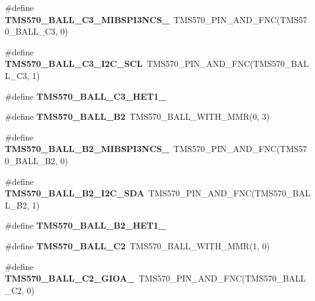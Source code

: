 \begin{DoxyCompactItemize}
\#define {\bfseries T\+M\+S570\+\_\+\+B\+A\+L\+L\+\_\+\+C3\+\_\+\+M\+I\+B\+S\+P\+I3\+N\+C\+S\+\_}~T\+M\+S570\+\_\+\+P\+I\+N\+\_\+\+A\+N\+D\+\_\+\+F\+NC(T\+M\+S570\+\_\+\+B\+A\+L\+L\+\_\+\+C3, 0)
\item 
\mbox{\label{tms570ls3137zwt-pins_8h_a36a40f8a7742c58ecb86e54473c8b882}} 
\#define {\bfseries T\+M\+S570\+\_\+\+B\+A\+L\+L\+\_\+\+C3\+\_\+\+I2\+C\+\_\+\+S\+CL}~T\+M\+S570\+\_\+\+P\+I\+N\+\_\+\+A\+N\+D\+\_\+\+F\+NC(T\+M\+S570\+\_\+\+B\+A\+L\+L\+\_\+\+C3, 1)
\item 
\#define {\bfseries T\+M\+S570\+\_\+\+B\+A\+L\+L\+\_\+\+C3\+\_\+\+H\+E\+T1\+\_}
\item 
\mbox{\label{tms570ls3137zwt-pins_8h_a3c413a4eec516f96f5b78e1d709fdd92}} 
\#define {\bfseries T\+M\+S570\+\_\+\+B\+A\+L\+L\+\_\+\+B2}~T\+M\+S570\+\_\+\+B\+A\+L\+L\+\_\+\+W\+I\+T\+H\+\_\+\+M\+MR(0, 3)
\item 
\mbox{\label{tms570ls3137zwt-pins_8h_aca9b2b8e392aa5928db939e10640f84e}} 
\#define {\bfseries T\+M\+S570\+\_\+\+B\+A\+L\+L\+\_\+\+B2\+\_\+\+M\+I\+B\+S\+P\+I3\+N\+C\+S\+\_}~T\+M\+S570\+\_\+\+P\+I\+N\+\_\+\+A\+N\+D\+\_\+\+F\+NC(T\+M\+S570\+\_\+\+B\+A\+L\+L\+\_\+\+B2, 0)
\item 
\mbox{\label{tms570ls3137zwt-pins_8h_a82ed3df0151ff6304a94a477e9caf638}} 
\#define {\bfseries T\+M\+S570\+\_\+\+B\+A\+L\+L\+\_\+\+B2\+\_\+\+I2\+C\+\_\+\+S\+DA}~T\+M\+S570\+\_\+\+P\+I\+N\+\_\+\+A\+N\+D\+\_\+\+F\+NC(T\+M\+S570\+\_\+\+B\+A\+L\+L\+\_\+\+B2, 1)
\item 
\#define {\bfseries T\+M\+S570\+\_\+\+B\+A\+L\+L\+\_\+\+B2\+\_\+\+H\+E\+T1\+\_}
\item 
\mbox{\label{tms570ls3137zwt-pins_8h_a6941f92cf330362b3f43284d1f67152a}} 
\#define {\bfseries T\+M\+S570\+\_\+\+B\+A\+L\+L\+\_\+\+C2}~T\+M\+S570\+\_\+\+B\+A\+L\+L\+\_\+\+W\+I\+T\+H\+\_\+\+M\+MR(1, 0)
\item 
\mbox{\label{tms570ls3137zwt-pins_8h_a89c3d9ba319b8f2968418955312f96eb}} 
\#define {\bfseries T\+M\+S570\+\_\+\+B\+A\+L\+L\+\_\+\+C2\+\_\+\+G\+I\+O\+A\+\_}~T\+M\+S570\+\_\+\+P\+I\+N\+\_\+\+A\+N\+D\+\_\+\+F\+NC(T\+M\+S570\+\_\+\+B\+A\+L\+L\+\_\+\+C2, 0)

\end{DoxyCompactItemize}
